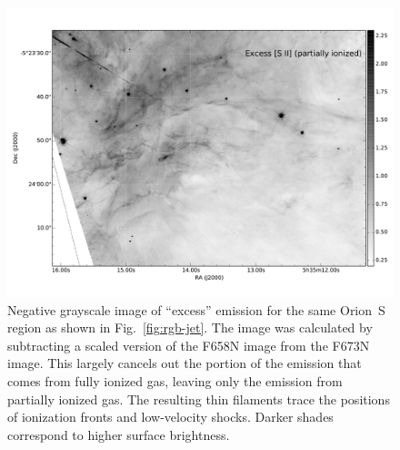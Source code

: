 \documentclass[preprint]{aastex}
\begin{document}
\begin{figure}
  \centering
  \includegraphics[width=\linewidth]{jet_region_excess-sii}
  \caption{Negative grayscale image of ``excess'' \sii{} emission for
    the same Orion~S region as shown in Fig.~\ref{fig:rgb-jet}.  The
    image was calculated by subtracting a scaled version of the F658N
    image from the F673N image.  This largely cancels out the portion
    of the \sii{} emission that comes from fully ionized gas, leaving
    only the emission from partially ionized gas.  The resulting thin
    filaments trace the positions of ionization fronts and
    low-velocity shocks.  Darker shades correspond to higher surface
    brightness.}
  \label{fig:sii-excess-jet}
\end{figure}
\end{document}
